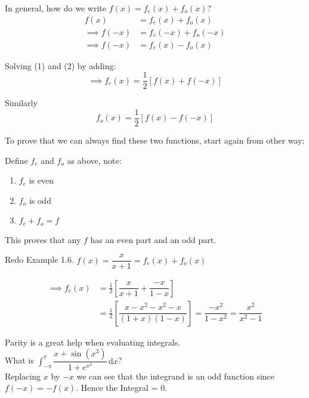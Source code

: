 \documentclass[twoside]{scrartcl}
\begin{document}
In general, how do we write $f(x) = f_e(x) + f_o(x)$?
\begin{align*}
f(x) &= f_e(x) + f_o(x) \tag{1}\\ 
\implies f(-x) &= f_e(-x) + f_o(-x) \\
\implies f(-x) &= f_e(x) - f_o(x) \tag{2}
\end{align*}

Solving (1) and (2) by adding: 
\[\implies f_e(x) = \frac{1}{2} [f(x) + f(-x)]\]

Similarly \[f_o(x) = \frac{1}{2} [f(x) - f(-x)]\]

To prove that we can always find these two functions, start again from other way:

Define $f_e$ and $f_o$ as above, note: 
\begin{enumerate}
\item $f_e$ is even
\item $f_o$ is odd
\item $f_e + f_o = f$
\end{enumerate}

This proves that any $f$ has an even part and an odd part.\\

\begin{example}
Redo Example 1.6. $f(x) = \dfrac{x}{x+1} = f_e(x) + f_o(x)$

\[\begin{aligned}\implies f_e(x) &= \frac{1}{2} \left[\dfrac{x}{x+1} + \dfrac{-x}{1-x}\right]\\
&= \frac{1}{2} \left[\dfrac{x - x^2 - x^2 -x}{(1+x)(1-x)}\right] = \dfrac{-x^2}{1-x^2} = \dfrac{x^2}{x^2-1}\end{aligned}\]

\end{example}

Parity is a great help when evaluating integrals.\\

What is $\displaystyle{ \int_{-\pi}^{\pi} \dfrac{x + \sin (x^3)}{1 + e^{x^2}} \, \mathrm{d}x}$?\\

Replacing $x$ by $-x$ we can see that the integrand is an odd function since $f(-x) = -f(x)$. Hence the Integral = 0.


  \begin{center}
\end{center}\vspace*{5pt}
\end{document}
